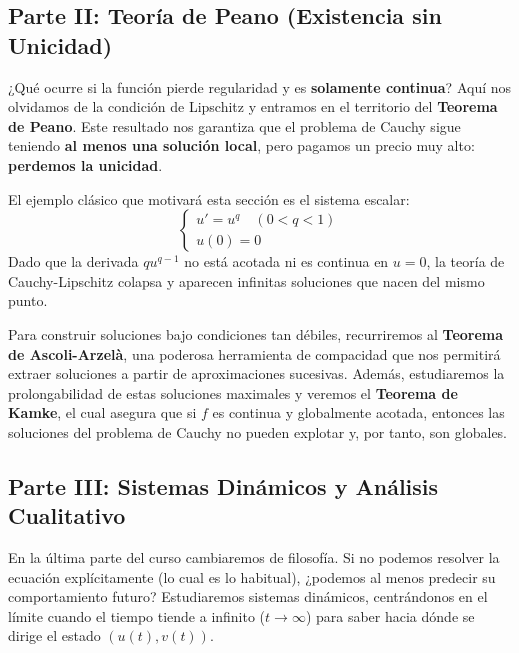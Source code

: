 \subsection*{Parte II: Teoría de Peano (Existencia sin Unicidad)}
¿Qué ocurre si la función pierde regularidad y es \textbf{solamente continua}? Aquí nos olvidamos de la condición de Lipschitz y entramos en el territorio del \textbf{Teorema de Peano}. Este resultado nos garantiza que el problema de Cauchy sigue teniendo \textbf{al menos una solución local}, pero pagamos un precio muy alto: \textbf{perdemos la unicidad}.

El ejemplo clásico que motivará esta sección es el sistema escalar:
\[
    \begin{cases}
        u' = u^q \quad (0 < q < 1) \\
        u(0) = 0
    \end{cases}
\]
Dado que la derivada $q u^{q-1}$ no está acotada ni es continua en $u=0$, la teoría de Cauchy-Lipschitz colapsa y aparecen infinitas soluciones que nacen del mismo punto.

Para construir soluciones bajo condiciones tan débiles, recurriremos al \textbf{Teorema de Ascoli-Arzelà}, una poderosa herramienta de compacidad que nos permitirá extraer soluciones a partir de aproximaciones sucesivas. Además, estudiaremos la prolongabilidad de estas soluciones maximales y veremos el \textbf{Teorema de Kamke}, el cual asegura que si $f$ es continua y globalmente acotada, entonces las soluciones del problema de Cauchy no pueden explotar y, por tanto, son globales.

\subsection*{Parte III: Sistemas Dinámicos y Análisis Cualitativo}
En la última parte del curso cambiaremos de filosofía. Si no podemos resolver la ecuación explícitamente (lo cual es lo habitual), ¿podemos al menos predecir su comportamiento futuro? Estudiaremos sistemas dinámicos, centrándonos en el límite cuando el tiempo tiende a infinito ($t \to \infty$) para saber hacia dónde se dirige el estado $(u(t), v(t))$.

